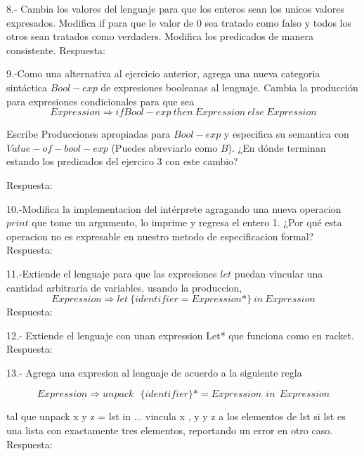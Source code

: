 \documentclass{article}
\begin{document}
8.- Cambia los valores del lenguaje para que los enteros sean los unicos valores expresados. Modifica if para que le valor de 0 sea tratado como falso y todos los otros sean tratados como verdaders. Modifica los predicados de manera consistente.\newline
Respuesta: \newline

9.-Como una alternativa al ejercicio anterior, agrega una nueva categoria sintáctica $Bool-exp$ de expresiones booleanas al lenguaje. Cambia la producción para expresiones condicionales para que sea \newline
$$
Expression \Rightarrow if Bool-exp  \: then \: Expression \: else  \:Expression
$$

Escribe Producciones apropiadas para $Bool-exp$ y especifica su semantica con $Value-of-bool-exp$ (Puedes abreviarlo como $B$). ¿En dónde terminan estando los predicados del ejercico 3 con este cambio? \newline

Respuesta: \newline

10.-Modifica la implementacion del intérprete agragando una nueva operacion $print$ que tome un argumento, lo imprime y regresa el entero 1. ¿Por qué esta operacion no es expresable en nuestro metodo de especificacion formal? \newline
Respuesta: \newline

11.-Extiende el lenguaje para que las expresiones $let$ puedan vincular una cantidad arbitraria de variables, usando la produccion,\newline
$$
Expression \Rightarrow  let \: \{ identifier = Expression* \}   \: in \: Expression
$$
Respuesta: \newline

12.- Extiende el lenguaje con unan expression Let* que funciona como en racket.\newline
Respuesta: \newline

13.- Agrega una expresion al lenguaje de acuerdo a la siguiente regla\newline

$$
Expression \Rightarrow  unpack \:\: \:  \{identifier\}* = Expression \:\:  in \: \:Expression
$$

tal que unpack x y z = lst in ... vincula x , y y z a los elementos de lst si lst es una lista con exactamente tres elementos, reportando un error en otro caso.\newline
Respuesta: \newline
\end{document}
